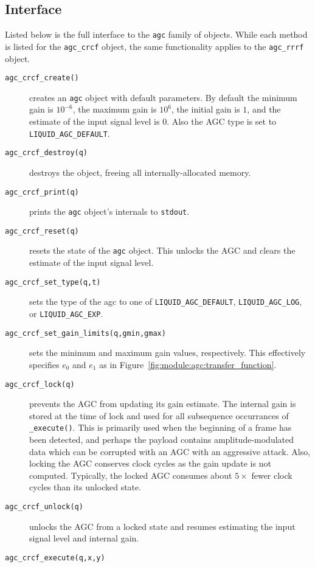 \subsection{Interface}
Listed below is the full interface to the {\tt agc} family of objects.
While each method is listed for the {\tt agc\_crcf} object, the same
functionality applies to the {\tt agc\_rrrf} object.
\begin{description}
\item[{\tt agc\_crcf\_create()}]
    creates an {\tt agc} object with default parameters.
    By default the minimum gain is $10^{-6}$, the maximum gain is $10^6$, the
    initial gain is $1$, and the estimate of the input signal level is $0$.
    Also the AGC type is set to {\tt LIQUID\_AGC\_DEFAULT}.
\item[{\tt agc\_crcf\_destroy(q)}]
    destroys the object, freeing all internally-allocated memory.
\item[{\tt agc\_crcf\_print(q)}]
    prints the {\tt agc} object's internals to {\tt stdout}.
\item[{\tt agc\_crcf\_reset(q)}]
    resets the state of the {\tt agc} object.
    This unlocks the AGC and clears the estimate of the input signal level.
\item[{\tt agc\_crcf\_set\_type(q,t)}]
    sets the type of the agc to one of
    {\tt LIQUID\_AGC\_DEFAULT},
    {\tt LIQUID\_AGC\_LOG}, or
    {\tt LIQUID\_AGC\_EXP}.
\item[{\tt agc\_crcf\_set\_gain\_limits(q,gmin,gmax)}]
    sets the minimum and maximum gain values, respectively.
    This effectively specifies $e_0$ and $e_1$ as in
    Figure~\ref{fig:module:agc:transfer_function}.
\item[{\tt agc\_crcf\_lock(q)}]
    prevents the AGC from updating its gain estimate.
    The internal gain is stored at the time of lock and used for all
    subsequence occurrances of {\tt \_execute()}.
    This is primarily used when the beginning of a frame has been detected,
    and perhaps the payload contains amplitude-modulated data which can be
    corrupted with an AGC with an aggressive attack.
    Also, locking the AGC conserves clock cycles as the gain update is not
    computed.
    Typically, the locked AGC consumes about $5\times$ fewer clock cycles than
    its unlocked state.
\item[{\tt agc\_crcf\_unlock(q)}]
    unlocks the AGC from a locked state and resumes estimating the input
    signal level and internal gain.
\item[{\tt agc\_crcf\_execute(q,x,y)}]

\end{description}
